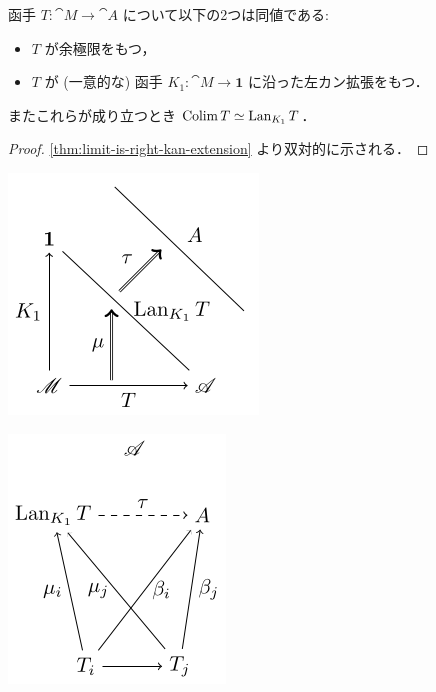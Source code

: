 \documentclass[titlepage]{ltjsreport}
\newtheorem[S]{theorem}{定理}[chapter]
\newtheorem[S]{definition}[theorem]{定義}
\newtheorem[S]{example}[theorem]{例}
\begin{document}
\begin{theorem}[余極限は左カン拡張である]
  函手 $T:\cat{M}\to\cat{A}$ について以下の2つは同値である:
  \begin{itemize}
    \item $T$ が余極限をもつ，
    \item $T$ が (一意的な) 函手 $K_1:\cat{M}\to\mathbf{1}$
          に沿った左カン拡張をもつ．
  \end{itemize}
  またこれらが成り立つとき $\operatorname{Colim} T\simeq\operatorname{Lan}_{K_1}T$．
\end{theorem}

\begin{proof}
  \cref{thm:limit-is-right-kan-extension} より双対的に示される．
\end{proof}

\begin{center}
  \begin{minipage}[b]{0.4\linewidth}
    \includegraphics{src/colim-left-kan-1}
  \end{minipage}
  \begin{minipage}[b]{0.4\linewidth}
    \includegraphics{src/colim-left-kan-2}
  \end{minipage}
\end{center}
\end{document}

